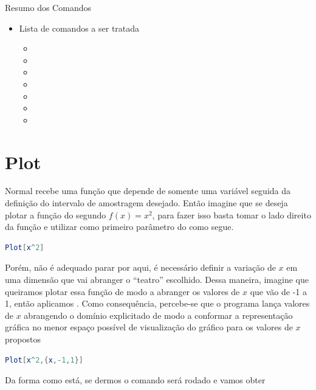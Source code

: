 \documentclass[a4paper, 12pt]{article}
\begin{document}
	\begin{center}
		\begin{huge}
			Resumo dos Comandos
		\end{huge}
	\end{center}

	\begin{itemize}
		\item Lista de comandos a ser tratada
		\begin{itemize}
			\item{}
			\item{}
			\item{}
			\item {}
			\item{}
			\item{}
			\item{}
		\end{itemize}
	\end{itemize}

	\section{Plot}
	Normal recebe uma função que depende de somente uma variável seguida da definição do intervalo de amostragem desejado. Então imagine que se deseja plotar a função do segundo $f(x)=x^{2}$, para fazer isso basta tomar o lado direito da função e utilizar como primeiro parâmetro do  como segue.	

	\begin{lstlisting}[language=Mathematica]
	Plot[x^2]
	\end{lstlisting}
	
	Porém, não é adequado parar por aqui, é necessário definir a variação de $x$ em uma dimensão que vai abranger o ``teatro'' escolhido. Dessa maneira, imagine que queiramos plotar essa função de modo a abranger os valores de $x$ que vão de -1 a 1, então aplicamos . Como consequência, percebe-se que o programa lança valores de $x$ abrangendo o domínio explicitado de modo a conformar a representação gráfica no menor espaço possível de visualização do gráfico para os valores de $x$ propostos
	
	\begin{lstlisting}[language=Mathematica]
	Plot[x^2,{x,-1,1}]
	\end{lstlisting}
	
	Da forma como está, se dermos  o comando será rodado e vamos obter
	
\end{document}
